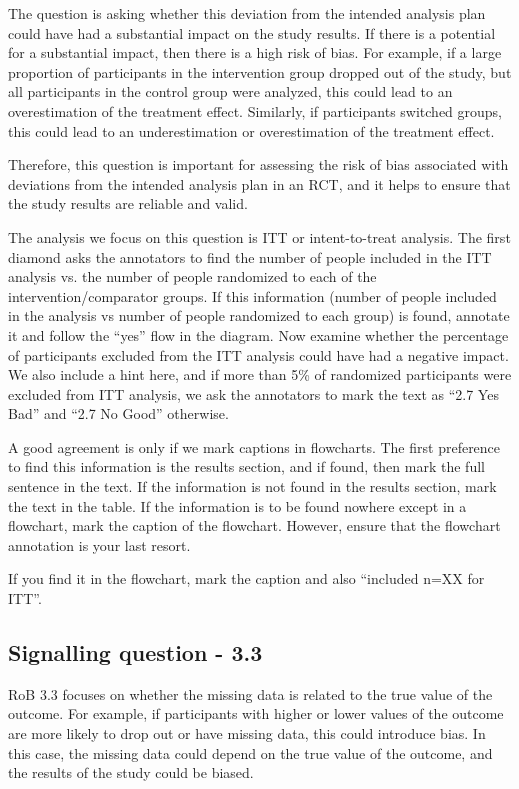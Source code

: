 \documentclass[sn-mathphys,Numbered]{sn-jnl}%
\begin{document}
The question is asking whether this deviation from the intended analysis plan could have had a substantial impact on the study results. If there is a potential for a substantial impact, then there is a high risk of bias. For example, if a large proportion of participants in the intervention group dropped out of the study, but all participants in the control group were analyzed, this could lead to an overestimation of the treatment effect. Similarly, if participants switched groups, this could lead to an underestimation or overestimation of the treatment effect.

Therefore, this question is important for assessing the risk of bias associated with deviations from the intended analysis plan in an RCT, and it helps to ensure that the study results are reliable and valid.


The analysis we focus on this question is ITT or intent-to-treat analysis.
The first diamond asks the annotators to find the number of people included in the ITT analysis vs. the number of people randomized to each of the intervention/comparator groups. 
If this information (number of people included in the analysis vs number of people randomized to each group) is found, annotate it and follow the ``yes'' flow in the diagram.
Now examine whether the percentage of participants excluded from the ITT analysis could have had a negative impact.
We also include a hint here, and if more than 5\% of randomized participants were excluded from ITT analysis, we ask the annotators to mark the text as ``2.7 Yes Bad'' and ``2.7 No Good'' otherwise.

A good agreement is only if we mark captions in flowcharts.
The first preference to find this information is the results section, and if found, then mark the full sentence in the text.
If the information is not found in the results section, mark the text in the table.
If the information is to be found nowhere except in a flowchart, mark the caption of the flowchart.
However, ensure that the flowchart annotation is your last resort.

If you find it in the flowchart, mark the caption and also ``included n=XX for ITT''. %
%
%
%
%
%
%
%
\subsection*{Signalling question - 3.3 }
%
RoB 3.3 focuses on whether the missing data is related to the true value of the outcome. For example, if participants with higher or lower values of the outcome are more likely to drop out or have missing data, this could introduce bias. In this case, the missing data could depend on the true value of the outcome, and the results of the study could be biased.
\end{document}
